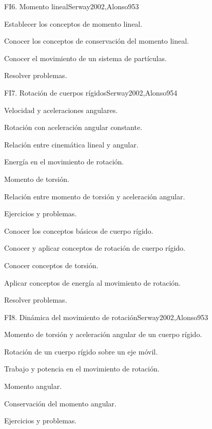 \begin{sumilla}
\begin{unit}{FI6. Momento lineal}{Serway2002,Alonso95}{3}
   \begin{objetivos}
      \item Establecer los conceptos de momento lineal.
      \item Conocer los conceptos de conservaci\'on del momento lineal.
      \item Conocer el movimiento de un sistema de part\'iculas.
      \item Resolver problemas.
   \end{objetivos}
\end{unit}

\begin{unit}{FI7. Rotaci\'on de cuerpos r\'igidos}{Serway2002,Alonso95}{4}
\begin{topicos}
      \item Velocidad y aceleraciones angulares.
      \item Rotaci\'on con aceleraci\'on angular constante.
      \item Relaci\'on entre cinem\'atica lineal y angular.
      \item Energ\'ia en el movimiento de rotaci\'on.
      \item Momento de torsi\'on.
      \item Relaci\'on entre momento de torsi\'on y aceleraci\'on angular.
      \item Ejercicios y problemas.
   \end{topicos}

   \begin{objetivos}
      \item Conocer los conceptos b\'asicos de cuerpo r\'igido.
      \item Conocer y aplicar conceptos de rotaci\'on de cuerpo r\'igido.
      \item Conocer conceptos de torsi\'on.
      \item Aplicar conceptos de energ\'ia al movimiento de rotaci\'on.
      \item Resolver problemas.
   \end{objetivos}
\end{unit}

\begin{unit}{FI8. Din\'amica del movimiento de rotaci\'on}{Serway2002,Alonso95}{3}
\begin{topicos}
      \item Momento de torsi\'on y aceleraci\'on angular de un cuerpo r\'igido.
      \item Rotaci\'on de un cuerpo r\'igido sobre un eje m\'ovil.
      \item Trabajo y potencia en el movimiento de rotaci\'on.
      \item Momento angular.
      \item Conservaci\'on del momento angular.
      \item Ejercicios y problemas.
    \end{topicos}


\end{unit}
\end{sumilla}
